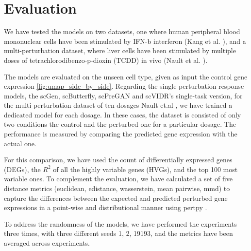 \documentclass[12pt, a4paper]{article}
\begin{document}
\clearpage


\section{Evaluation}



We have tested the models on two datasets, one where human peripheral blood mononuclear cells have been stimulated by IFN-b interferon (Kang et al. \cite{kanaGenerativeModelingSinglecell2023}), and a multi-perturbation dataset, where liver cells have been stimulated by multiple doses of tetrachlorodibenzo-p-dioxin (TCDD) in vivo (Nault et al. \cite{nault2021single,nault2022benchmarking}).

The models are evaluated on the unseen cell type, given as input the control gene expression \cref{fig:umap_side_by_side}.
Regarding the single perturbation response models, the scGen, scButterfly, scPreGAN and scVIDR's single-task version, for the multi-perturbation dataset of ten dosages Nault et.al \cite{nault2021single,nault2022benchmarking}, we have trained a dedicated model for each dosage. In these cases, the dataset is consisted of only two conditions the control and the perturbed one for a particular dosage. The performance is measured by comparing the predicted gene expression with the actual one.

For this comparison, we have used the count of differentially expressed genes (DEGs), the $R^2$ of all the highly variable genes (HVGs), and the top 100 most variable ones. To complement the evaluation, we have calculated a set of five distance metrics (euclidean, edistance, wasserstein, mean pairwise, mmd) to capture the differences between the expected and predicted perturbed gene expressions in a point-wise and distributional manner using pertpy \cite{heumos2024pertpy}.

To address the randomness of the models, we have performed the experiments three times, with three different seeds 1, 2, 19193, and the metrics have been averaged across experiments.
\end{document}
